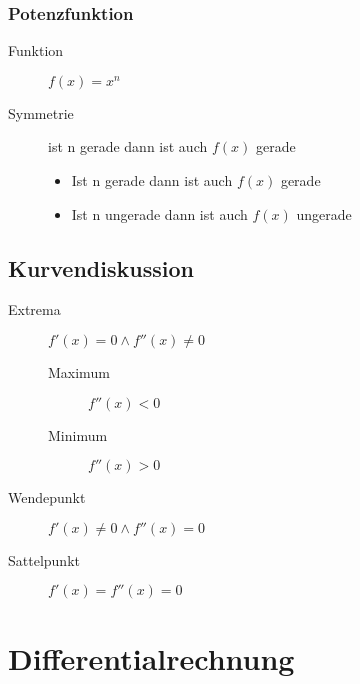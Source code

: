 \documentclass[a4paper]{scrartcl}
\begin{document}
        
        \subsubsection{Potenzfunktion}
           \begin{description}
               \item[Funktion] $f(x) = x^n$ 
               \item[Symmetrie] ist n gerade dann ist auch $f(x)$ gerade
               \begin{itemize}
                   \item Ist n gerade dann ist auch $f(x)$ gerade
                   \item Ist n ungerade dann ist auch $f(x)$ ungerade
               \end{itemize} 
           \end{description}       
    

           \subsection{Kurvendiskussion}
                \begin{description}
                    \item[Extrema] \(f'(x) = 0 \wedge f''(x) \neq 0\)
                    \begin{description}
                        \item[Maximum] \(f''(x) < 0\)
                        \item[Minimum]  \(f''(x) > 0\)
                    \end{description}
                    \item[Wendepunkt] \( f'(x) \neq 0 \wedge f''(x) = 0 \)
                    \item[Sattelpunkt] \(f'(x) = f''(x) = 0\) 
                \end{description}



    \section{Differentialrechnung}
\end{document}
